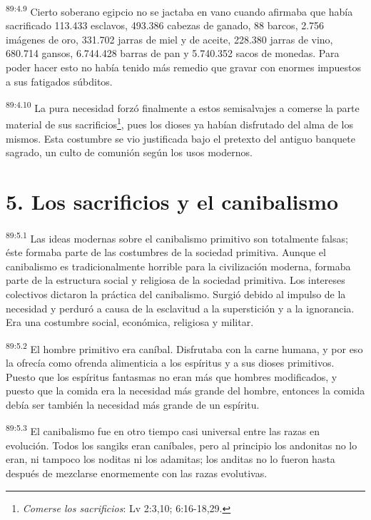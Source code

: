 \par
\textsuperscript{89:4.9} Cierto soberano egipcio no se jactaba en vano cuando afirmaba que había sacrificado 113.433 esclavos, 493.386 cabezas de ganado, 88 barcos, 2.756 imágenes de oro, 331.702 jarras de miel y de aceite, 228.380 jarras de vino, 680.714 gansos, 6.744.428 barras de pan y 5.740.352 sacos de monedas. Para poder hacer esto no había tenido más remedio que gravar con enormes impuestos a sus fatigados súbditos.

\par
\textsuperscript{89:4.10} La pura necesidad forzó finalmente a estos semisalvajes a comerse la parte material de sus sacrificios\footnote{\textit{Comerse los sacrificios}: Lv 2:3,10; 6:16-18,29.}, pues los dioses ya habían disfrutado del alma de los mismos. Esta costumbre se vio justificada bajo el pretexto del antiguo banquete sagrado, un culto de comunión según los usos modernos.

\section*{5. Los sacrificios y el canibalismo}
\par
\textsuperscript{89:5.1} Las ideas modernas sobre el canibalismo primitivo son totalmente falsas; éste formaba parte de las costumbres de la sociedad primitiva. Aunque el canibalismo es tradicionalmente horrible para la civilización moderna, formaba parte de la estructura social y religiosa de la sociedad primitiva. Los intereses colectivos dictaron la práctica del canibalismo. Surgió debido al impulso de la necesidad y perduró a causa de la esclavitud a la superstición y a la ignorancia. Era una costumbre social, económica, religiosa y militar.

\par
\textsuperscript{89:5.2} El hombre primitivo era caníbal. Disfrutaba con la carne humana, y por eso la ofrecía como ofrenda alimenticia a los espíritus y a sus dioses primitivos. Puesto que los espíritus fantasmas no eran más que hombres modificados, y puesto que la comida era la necesidad más grande del hombre, entonces la comida debía ser también la necesidad más grande de un espíritu.

\par
\textsuperscript{89:5.3} El canibalismo fue en otro tiempo casi universal entre las razas en evolución. Todos los sangiks eran caníbales, pero al principio los andonitas no lo eran, ni tampoco los noditas ni los adamitas; los anditas no lo fueron hasta después de mezclarse enormemente con las razas evolutivas.

